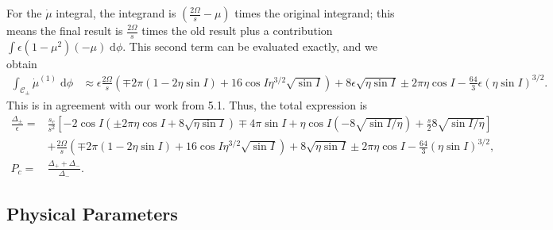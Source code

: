 \documentclass[11pt,
        usenames, %
        dvipsnames %
    ]{article}
\newcommand*{\p}[1]{\left(#1\right)}
\newcommand*{\s}[1]{\left[#1\right]}
\begin{document}
For the $\dot{\mu}$ integral, the integrand is $\p{\frac{2\Omega}{s} - \mu}$
times the original integrand; this means the final result is $\frac{2\Omega}{s}$
times the old result plus a contribution $\int \epsilon \p{1 - \mu^2}\p{-\mu}
\;\mathrm{d}\phi$. This second term can be evaluated exactly, and we obtain
\begin{align*}
    \int_{\mathcal{C}_{\pm}}\dot{\mu}^{(1)}\;\mathrm{d}\phi
        &\approx \epsilon\frac{2\Omega}{s}\p{\mp 2\pi\p{1 - 2\eta \sin I}
            + 16\cos I \eta^{3/2}\sqrt{\sin I}}
            + 8\epsilon\sqrt{\eta \sin I}
            \pm 2 \pi \eta \cos I
            - \frac{64}{3}\epsilon \p{\eta \sin I}^{3/2}.
\end{align*}
This is in agreement with our work from 5.1. Thus, the total expression is
\begin{align}
    \frac{\Delta_{\pm}}{\epsilon} ={}&
        \frac{s_c}{s^2}\s{
            -2\cos I\p{\pm 2\pi \eta \cos I + 8\sqrt{\eta \sin I}}
            \mp 4\pi \sin I
            + \eta \cos I \p{-8\sqrt{\sin I / \eta}}
                + \frac{s}{2}8\sqrt{\sin I/\eta}}\nonumber\\
        &+ \frac{2\Omega}{s}\p{\mp 2\pi\p{1 - 2\eta \sin I}
            + 16\cos I \eta^{3/2}\sqrt{\sin I}}
            + 8\sqrt{\eta \sin I}
            \pm 2 \pi \eta \cos I
            - \frac{64}{3} \p{\eta \sin I}^{3/2},\\
    P_c ={}& \frac{\Delta_+ + \Delta_-}{\Delta_-}.
\end{align}

\subsection{Physical Parameters}
\end{document}
